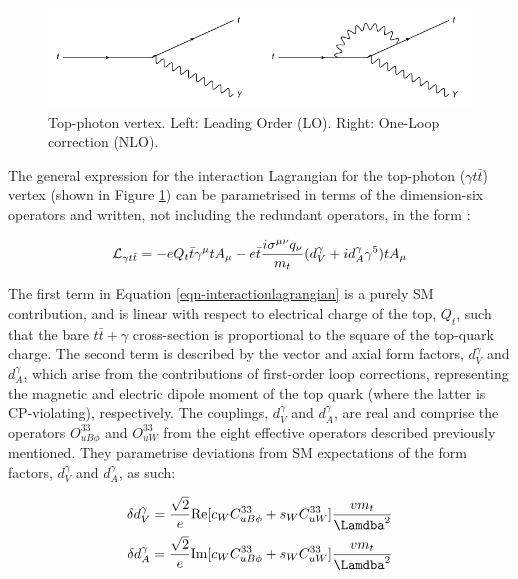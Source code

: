 \begin{figure} \label{fig-TopPhotonVertex}
\begin{center}
\includegraphics[width=\textwidth]{Figures/TopPhotonVertex.png}
\caption{Top-photon vertex. Left: Leading Order (LO). Right: One-Loop correction (NLO).}
\end{center}
\end{figure}

The general expression for the interaction Lagrangian for the top-photon ($\gamma t \bar{t}$) vertex (shown in Figure \ref{fig-TopPhotonVertex}) can be parametrised in terms of the dimension-six operators and written, not including the redundant operators, in the form \cite{anom-coups}:

\begin{equation} \label{eqn-interactionlagrangian}
\mathcal{L}_{\gamma t\bar{t}} = -eQ_t\bar{t}\gamma^{\mu}tA_{\mu} - e\bar{t}\frac{i\sigma^{\mu\nu}q_{\nu}}{m_t}(d^{\gamma}_V+id^{\gamma}_A\gamma^5)tA_{\mu}
\end{equation}

The first term in Equation \ref{eqn-interactionlagrangian} is a purely SM contribution, and is linear with respect to electrical charge of the top, $Q_t$, such that the bare $t\bar{t}+\gamma$ cross-section is proportional to the square of the top-quark charge. The second term is described by the vector and axial form factors, $d^{\gamma}_V$ and $d^{\gamma}_A$, which arise from the contributions of first-order loop corrections, representing the magnetic and electric dipole moment of the top quark (where the latter is CP-violating), respectively. The couplings, $d^{\gamma}_V$ and $d^{\gamma}_A$, are real and comprise the operators $O^{33}_{uB\phi}$ and $O^{33}_{uW}$ from the eight effective operators described previously mentioned. They parametrise deviations from SM expectations of the form factors, $d^{\gamma}_V$ and $d^{\gamma}_A$, as such:

\begin{align}\label{eqn-smparameterisations}
\delta d^{\gamma}_V = \frac{\sqrt{2}}{e}\text{Re}[c_WC^{33}_{uB\phi} + s_WC^{33}_{uW}]\frac{vm_t}{\Lamdba^2} \\
\delta d^{\gamma}_A = \frac{\sqrt{2}}{e}\text{Im}[c_WC^{33}_{uB\phi} + s_WC^{33}_{uW}]\frac{vm_t}{\Lamdba^2}
\end{align}


